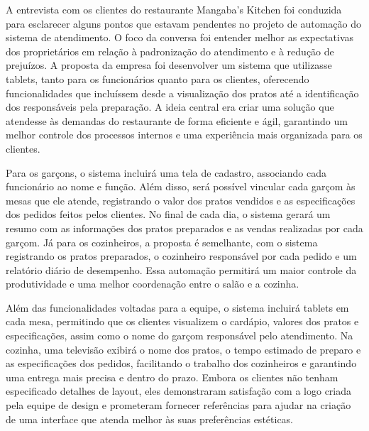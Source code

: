 \hspace{4.5mm}
A entrevista com os clientes do restaurante Mangaba's Kitchen foi conduzida para esclarecer alguns pontos que estavam pendentes no projeto de automação do sistema de atendimento. O foco da conversa foi entender melhor as expectativas dos proprietários em relação à padronização do atendimento e à redução de prejuízos. A proposta da empresa foi desenvolver um sistema que utilizasse tablets, tanto para os funcionários quanto para os clientes, oferecendo funcionalidades que incluíssem desde a visualização dos pratos até a identificação dos responsáveis pela preparação. A ideia central era criar uma solução que atendesse às demandas do restaurante de forma eficiente e ágil, garantindo um melhor controle dos processos internos e uma experiência mais organizada para os clientes.
\par
Para os garçons, o sistema incluirá uma tela de cadastro, associando cada funcionário ao nome e função. Além disso, será possível vincular cada garçom às mesas que ele atende, registrando o valor dos pratos vendidos e as especificações dos pedidos feitos pelos clientes. No final de cada dia, o sistema gerará um resumo com as informações dos pratos preparados e as vendas realizadas por cada garçom. Já para os cozinheiros, a proposta é semelhante, com o sistema registrando os pratos preparados, o cozinheiro responsável por cada pedido e um relatório diário de desempenho. Essa automação permitirá um maior controle da produtividade e uma melhor coordenação entre o salão e a cozinha.
\par
Além das funcionalidades voltadas para a equipe, o sistema incluirá tablets em cada mesa, permitindo que os clientes visualizem o cardápio, valores dos pratos e especificações, assim como o nome do garçom responsável pelo atendimento. Na cozinha, uma televisão exibirá o nome dos pratos, o tempo estimado de preparo e as especificações dos pedidos, facilitando o trabalho dos cozinheiros e garantindo uma entrega mais precisa e dentro do prazo. Embora os clientes não tenham especificado detalhes de layout, eles demonstraram satisfação com a logo criada pela equipe de design e prometeram fornecer referências para ajudar na criação de uma interface que atenda melhor às suas preferências estéticas.